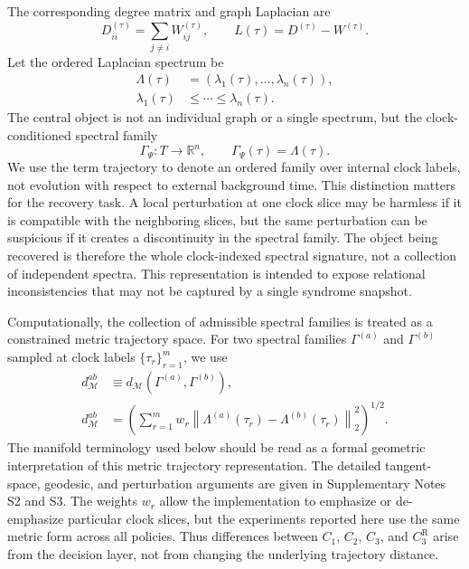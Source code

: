 \documentclass{iopjournal}
\begin{document}
The corresponding degree matrix and graph Laplacian are
\begin{equation}
D^{(\tau)}_{ii}=\sum_{j\neq i} W^{(\tau)}_{ij},
\qquad
L(\tau)=D^{(\tau)}-W^{(\tau)}.
\end{equation}
Let the ordered Laplacian spectrum be
\begin{equation}
\begin{aligned}
\Lambda(\tau)
&=
\left(\lambda_1(\tau),\ldots,\lambda_n(\tau)\right),\\
\lambda_1(\tau)
&\le
\cdots
\le
\lambda_n(\tau).
\end{aligned}
\end{equation}
The central object is not an individual graph or a single spectrum, but the
clock-conditioned spectral family
\begin{equation}
\Gamma_\Psi:T\rightarrow\mathbb{R}^{n},
\qquad
\Gamma_\Psi(\tau)=\Lambda(\tau).
\label{eq:spectral-family}
\end{equation}
We use the term trajectory to denote an ordered family over internal clock labels,
not evolution with respect to external background time.
This distinction matters for the recovery task. A local perturbation at one clock
slice may be harmless if it is compatible with the neighboring slices, but the same
perturbation can be suspicious if it creates a discontinuity in the spectral
family. The object being recovered is therefore the whole clock-indexed spectral
signature, not a collection of independent spectra. This representation is
intended to expose relational inconsistencies that may not be captured by a single
syndrome snapshot.

Computationally, the collection of admissible spectral families is treated as a
constrained metric trajectory space. For two spectral families
$\Gamma^{(a)}$ and $\Gamma^{(b)}$ sampled at clock labels
$\{\tau_r\}_{r=1}^{m}$, we use
\begin{equation}
\begin{aligned}
d_{\mathcal M}^{ab}
&\equiv
d_{\mathcal{M}}\!\left(\Gamma^{(a)},\Gamma^{(b)}\right),\\
d_{\mathcal M}^{ab}
&=
\left(
\sum_{r=1}^{m}
w_r
\left\|
\Lambda^{(a)}(\tau_r)-\Lambda^{(b)}(\tau_r)
\right\|_2^2
\right)^{1/2}.
\end{aligned}
\label{eq:trajectory-distance}
\end{equation}
The manifold terminology used below should be read as a formal geometric
interpretation of this metric trajectory representation. The detailed tangent-space,
geodesic, and perturbation arguments are given in Supplementary Notes S2 and S3.
The weights $w_r$ allow the implementation to emphasize or de-emphasize particular
clock slices, but the experiments reported here use the same metric form across
all policies. Thus differences between $C_1$, $C_2$, $C_3$, and
$C_3^{\mathrm R}$ arise from the decision layer, not from changing the underlying
trajectory distance.
\end{document}

